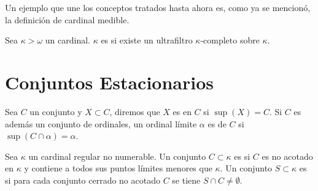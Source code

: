 Un ejemplo que une los conceptos tratados hasta ahora es, como ya se mencionó,
la definición de cardinal medible.

\begin{defi}
    Sea $\kappa > \omega$ un cardinal. $\kappa$ es  si existe
    un ultrafiltro $\kappa\text{-completo}$ sobre $\kappa$.
\end{defi}





\section{Conjuntos Estacionarios}

Sea $C$ un conjunto y $X\subset C$, diremos que $X$ es 
en $C$ si $\sup(X) = C$.
Si $C$ es además un conjunto de ordinales, un ordinal límite $\alpha$ es
 de $C$ si $\sup ( C \cap\alpha ) = \alpha$.
\begin{defi}
    Sea $\kappa$ un cardinal regular no numerable. Un conjunto $C\subset \kappa$
    es  si $C$ es no acotado en $\kappa$ y contiene a
    todos sus puntos límites menores que $\kappa$.
    Un conjunto $S\subset\kappa$ es  si para cada conjunto
    cerrado no acotado $C$ se tiene $S\cap C\neq\emptyset$.
\end{defi}

